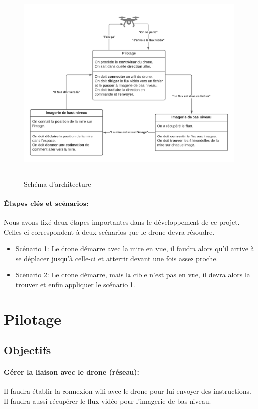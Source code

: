 \documentclass[12pt]{article}
\begin{document}
\begin{figure}[H]
\centering
\includegraphics[height=10cm]{ArchiVulgaire.png}
\caption{Schéma d'architecture}
\end{figure}

\paragraph*{Étapes clés et scénarios:}
Nous avons fixé deux étapes importantes dans le développement de ce projet. Celles-ci correspondent à deux scénarios que le drone devra résoudre. 
\begin{itemize}
\item 
Scénario 1: Le drone démarre avec la mire en vue, il faudra alors qu'il arrive à se déplacer jusqu'à celle-ci et atterrir devant une fois assez proche.
\item 
Scénario 2: Le drone démarre, mais la cible n'est pas en vue, il devra alors la trouver et enfin appliquer le scénario 1. 
\end{itemize}

\section{Pilotage\label{pilotage}}

\subsection{Objectifs}
\paragraph*{Gérer la liaison avec le drone (réseau):}
Il faudra établir la connexion wifi avec le drone pour lui envoyer des instructions.
Il faudra aussi récupérer le flux vidéo pour l'imagerie de bas niveau.
\end{document}
